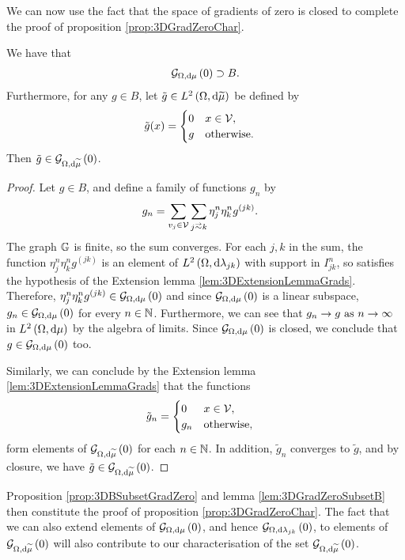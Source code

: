 We can now use the fact that the space of gradients of zero is closed to complete the proof of proposition \ref{prop:3DGradZeroChar}.
\begin{prop} \label{prop:3DBSubsetGradZero}
	We have that
	\begin{align*}
		\mathcal{G}_{ \Omega, \mathrm{d}\mu}\left( 0 \right) \supset B.
	\end{align*}
	Furthermore, for any $g\in B$, let $\tilde{g}\in L^{2}\left( \Omega,\mathrm{d}\widetilde{\mu} \right)$ be defined by
	\begin{align*}
		\tilde{g}(x) &= \begin{cases} 0 & x\in\mathcal{V}, \\ g & \mathrm{otherwise}. \end{cases}
	\end{align*}
	Then $\tilde{g}\in\mathcal{G}_{ \Omega, \mathrm{d}\widetilde{\mu}}\left( 0 \right)$.
\end{prop}
\begin{proof}
	Let $g\in B$, and define a family of functions $g_n$ by
	\begin{align*}
		g_n &= \sum_{v_j\in\vertSet}\sum_{j\conLeft k}\eta_j^n \eta_k^n g^{(jk)}.
	\end{align*}
	The graph $\mathbb{G}$ is finite, so the sum converges.
	For each $j,k$ in the sum, the function $\eta_j^n \eta_k^n g^{(jk)}$ is an element of $L^{2}\left( \Omega,\mathrm{d}\lambda_{jk} \right)$ with support in $I_{jk}^n$, so satisfies the hypothesis of the Extension lemma \ref{lem:3DExtensionLemmaGrads}.
	Therefore, $\eta_j^n \eta_k^n g^{(jk)}\in\mathcal{G}_{ \Omega, \mathrm{d}\mu}\left( 0 \right)$ and since $\mathcal{G}_{ \Omega, \mathrm{d}\mu}\left( 0 \right)$ is a linear subspace, $g_n\in\mathcal{G}_{ \Omega, \mathrm{d}\mu}\left( 0 \right)$ for every $n\in\mathbb{N}$.
	Furthermore, we can see that $g_n\rightarrow g \ \text{as} \ n \rightarrow\infty$ in $L^{2}\left( \Omega,\mathrm{d}\mu \right)$ by the algebra of limits.
	Since $\mathcal{G}_{ \Omega, \mathrm{d}\mu}\left( 0 \right)$ is closed, we conclude that $g\in\mathcal{G}_{ \Omega, \mathrm{d}\mu}\left( 0 \right)$ too.
	
	Similarly, we can conclude by the Extension lemma \ref{lem:3DExtensionLemmaGrads} that the functions
	\begin{align*}
		\tilde{g}_n &= \begin{cases} 0 & x\in\mathcal{V}, \\ g_n & \mathrm{otherwise}, \end{cases}
	\end{align*}
	form elements of $\mathcal{G}_{ \Omega, \mathrm{d}\widetilde{\mu}}\left( 0 \right)$ for each $n\in\mathbb{N}$.
	In addition, $\tilde{g}_n$ converges to $\tilde{g}$, and by closure, we have $\tilde{g}\in\mathcal{G}_{ \Omega, \mathrm{d}\widetilde{\mu}}\left( 0 \right)$.
\end{proof}
Proposition \ref{prop:3DBSubsetGradZero} and lemma \ref{lem:3DGradZeroSubsetB} then constitute the proof of proposition \ref{prop:3DGradZeroChar}.
The fact that we can also extend elements of $\mathcal{G}_{ \Omega, \mathrm{d}\mu}\left( 0 \right)$, and hence $\mathcal{G}_{ \Omega, \mathrm{d}\lambda_{jk}}\left( 0 \right)$, to elements of $\mathcal{G}_{ \Omega, \mathrm{d}\widetilde{\mu}}\left( 0 \right)$ will also contribute to our characterisation of the set $\mathcal{G}_{ \Omega, \mathrm{d}\widetilde{\mu}}\left( 0 \right)$.

